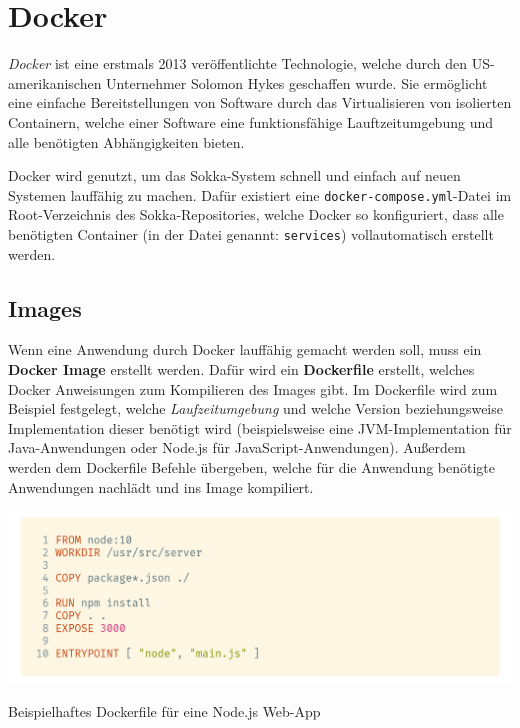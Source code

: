 \section{Docker}

\textit{Docker} ist eine erstmals 2013 veröffentlichte Technologie, welche durch den US-amerikanischen Unternehmer Solomon Hykes geschaffen wurde. \cite{hykes2018} Sie ermöglicht eine einfache Bereitstellungen von Software durch das Virtualisieren von isolierten Containern, welche einer Software eine funktionsfähige Lauftzeitumgebung und alle benötigten Abhängigkeiten bieten.

Docker wird genutzt, um das Sokka-System schnell und einfach auf neuen Systemen lauffähig zu machen. Dafür existiert eine \lstinline{docker-compose.yml}-Datei im Root-Verzeichnis des Sokka-Repositories, welche Docker so konfiguriert, dass alle benötigten Container (in der Datei genannt: \lstinline{services}) vollautomatisch erstellt werden.

\subsection{Images}

Wenn eine Anwendung durch Docker lauffähig gemacht werden soll, muss ein \textbf{Docker Image} erstellt werden. Dafür wird ein \textbf{Dockerfile} erstellt, welches Docker Anweisungen zum Kompilieren des Images gibt. Im Dockerfile wird zum Beispiel festgelegt, welche \textit{Laufzeitumgebung} und welche Version beziehungsweise Implementation dieser benötigt wird (beispielsweise eine JVM-Implementation für Java-Anwendungen oder Node.js für JavaScript-Anwendungen). Außerdem werden dem Dockerfile Befehle übergeben, welche für die Anwendung benötigte Anwendungen nachlädt und ins Image kompiliert.

\begin{code}[htp]
    \begin{center}
        \includegraphics[width=1\textwidth]{images/Docker/dockerfile.png}
        \caption{Beispielhaftes Dockerfile für eine Node.js Web-App}
    \end{center}
\end{code}

